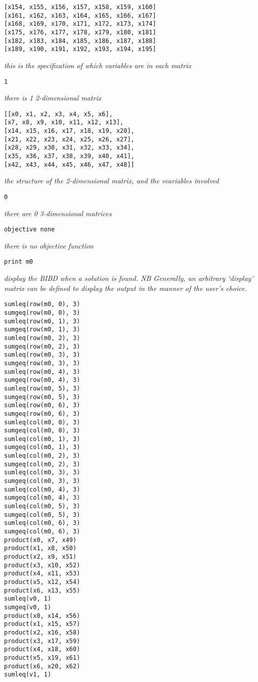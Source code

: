 \documentclass{article}
\begin{document}
\begin{small}
\begin{verbatim}
[x154, x155, x156, x157, x158, x159, x160]
[x161, x162, x163, x164, x165, x166, x167]
[x168, x169, x170, x171, x172, x173, x174]
[x175, x176, x177, x178, x179, x180, x181]
[x182, x183, x184, x185, x186, x187, x188]
[x189, x190, x191, x192, x193, x194, x195]
\end{verbatim}
\emph{this is the specification of which variables are in each matrix}
\begin{verbatim}
1
\end{verbatim}
\emph{there is 1 2-dimensional matrix}
\begin{verbatim}
[[x0, x1, x2, x3, x4, x5, x6],
[x7, x8, x9, x10, x11, x12, x13],
[x14, x15, x16, x17, x18, x19, x20],
[x21, x22, x23, x24, x25, x26, x27],
[x28, x29, x30, x31, x32, x33, x34],
[x35, x36, x37, x38, x39, x40, x41],
[x42, x43, x44, x45, x46, x47, x48]]
\end{verbatim}
\emph{the structure of the 2-dimensional matrix, and the veariables involved}
\begin{verbatim}
0
\end{verbatim}
\emph{there are 0 3-dimensional matrices}
\begin{verbatim}
objective none
\end{verbatim}
\emph{there is no objective function}
\begin{verbatim}
print m0
\end{verbatim}
\emph{display the BIBD when a solution is found. NB Generally, an arbitrary
`display' matrix can be defined to display the output in the manner of the
user's choice.}
\begin{verbatim}
sumleq(row(m0, 0), 3)
sumgeq(row(m0, 0), 3)
sumleq(row(m0, 1), 3)
sumgeq(row(m0, 1), 3)
sumleq(row(m0, 2), 3)
sumgeq(row(m0, 2), 3)
sumleq(row(m0, 3), 3)
sumgeq(row(m0, 3), 3)
sumleq(row(m0, 4), 3)
sumgeq(row(m0, 4), 3)
sumleq(row(m0, 5), 3)
sumgeq(row(m0, 5), 3)
sumleq(row(m0, 6), 3)
sumgeq(row(m0, 6), 3)
sumleq(col(m0, 0), 3)
sumgeq(col(m0, 0), 3)
sumleq(col(m0, 1), 3)
sumgeq(col(m0, 1), 3)
sumleq(col(m0, 2), 3)
sumgeq(col(m0, 2), 3)
sumleq(col(m0, 3), 3)
sumgeq(col(m0, 3), 3)
sumleq(col(m0, 4), 3)
sumgeq(col(m0, 4), 3)
sumleq(col(m0, 5), 3)
sumgeq(col(m0, 5), 3)
sumleq(col(m0, 6), 3)
sumgeq(col(m0, 6), 3)
product(x0, x7, x49)
product(x1, x8, x50)
product(x2, x9, x51)
product(x3, x10, x52)
product(x4, x11, x53)
product(x5, x12, x54)
product(x6, x13, x55)
sumleq(v0, 1)
sumgeq(v0, 1)
product(x0, x14, x56)
product(x1, x15, x57)
product(x2, x16, x58)
product(x3, x17, x59)
product(x4, x18, x60)
product(x5, x19, x61)
product(x6, x20, x62)
sumleq(v1, 1)

\end{verbatim}
\end{small}
\end{document}
